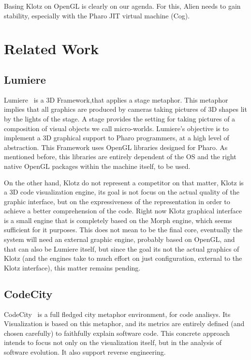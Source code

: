 \documentclass{sig-alternate}
\newcommand{\ab}[1]{\nb{Alexandre}{blue}{#1}}
\newcommand{\seclabel}[1]{\label{sec:#1}}
\begin{document}
Basing Klotz on OpenGL is clearly on our agenda. For this, Alien needs to gain stability, especially with the Pharo JIT virtual machine (Cog).

\section{Related Work} \seclabel{relatedwork}
\ab{need to go over this}
\subsection{Lumiere}
Lumiere~\cite{Oliv09a} is a 3D Framework,that applies a stage metaphor.
This metaphor implies that all graphics are produced by cameras
taking pictures of 3D shapes lit by the lights of the stage. A
stage provides the setting for taking pictures of a composition 
of visual objects we call micro-worlds. Lumiere's objective
is to implement a 3D graphical support to Pharo programmers, at
a high level of abstraction. This Framework uses OpenGL libraries
designed for Pharo. As mentioned before, this libraries are 
entirely dependent of the OS and the right native OpenGL packages
within the machine itself, to be used.

On the other hand, Klotz do not represent a competitor on that 
matter, Klotz is a 3D code visualization engine, its goal is
not focus on the actual quality of the graphic interface, but 
on the expressiveness of the representation in order to achieve
a better comprehension of the code. Right now Klotz graphical
interface is a small engine that is completely based on the Morph
engine, which seems sufficient for it  purposes. This does not
mean to be the final core, eventually the system will need an
external graphic engine, probably based on OpenGL, and that can
also be Lumiere itself, but since the goal its not the actual
graphics of Klotz (and the engines take to much effort on just
configuration, external to the Klotz interface), this matter
remains pending.

\subsection{CodeCity}
CodeCity~\cite{Wett08d} is a full fledged city metaphor environment, for code
analisys. Its Visualization is based on this metaphor, and its
metrics are entirely defined (and chosen carefully) to faithfully
explain software code. This concrete approach intends to focus
not only on the visualization itself, but in the analysis of software
evolution. It also support  reverse engineering.
\end{document}
